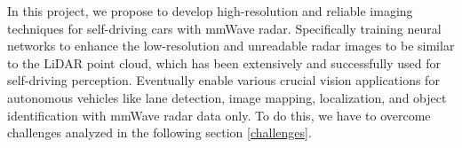 In this project, we propose to develop high-resolution and reliable imaging techniques for self-driving cars with mmWave radar. Specifically training neural networks to enhance the low-resolution and unreadable radar images to be similar to the LiDAR point cloud, which has been extensively and successfully used for self-driving perception. Eventually enable various crucial vision applications for autonomous vehicles like lane detection, image mapping, localization, and object identification with mmWave radar data only. To do this, we have to overcome challenges analyzed in the following section \ref{challenges}.
 
